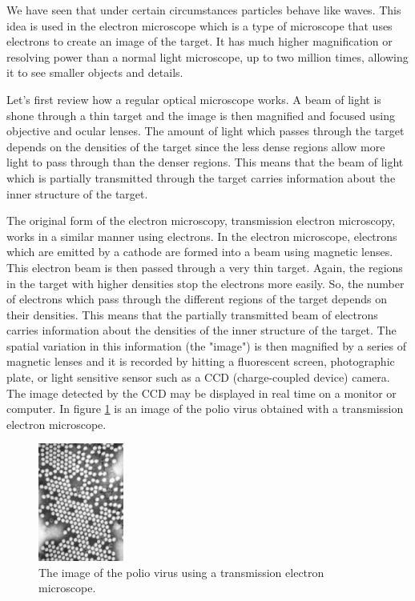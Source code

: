 We have seen that under certain circumstances particles behave like waves. This idea is used in the electron microscope which is a type of microscope that uses electrons to create an image of the target. It has much higher magnification or resolving power than a normal light microscope, up to two million times, allowing it to see smaller objects and details.


Let's first review how a regular optical microscope works.  A beam of light is shone through a thin target and the image is then magnified and focused using objective and ocular lenses. The amount of light  which passes through the target depends on the densities of the target since the less dense regions allow more light to pass through than the denser regions. This means that the beam of light which is partially transmitted through the target carries information about the inner structure of the target. 

The original form of the electron microscopy, transmission electron microscopy, works in a similar manner using electrons. In the electron microscope, electrons which are emitted by a cathode are formed into a beam using magnetic lenses. This electron beam is then passed through a very thin target. Again, the regions in the target with higher densities stop the electrons more easily. So, the number of electrons which pass through the different regions of the target depends on their densities. This means that the partially transmitted beam of electrons carries information about the densities of the inner structure of the target. The spatial variation in this information (the "image") is then magnified by a series of magnetic lenses and it is recorded by hitting a fluorescent screen, photographic plate, or light sensitive sensor such as a CCD (charge-coupled device) camera. The image detected by the CCD may be displayed in real time on a monitor or computer. In figure \ref{fig:polio} is an image of the polio virus obtained with a transmission electron microscope.

\begin{figure}[H]
\begin{center}
\includegraphics[width=0.25\textwidth]{../../epsimages/mm-Polio.eps}
\caption{The image of the polio virus using a transmission electron microscope.}
\label{fig:polio}
\end{center}
\end{figure}

